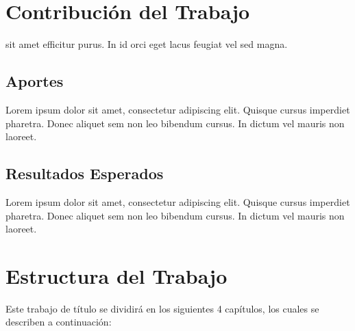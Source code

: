   \section{Contribución del Trabajo}

    sit amet efficitur purus. In id orci eget lacus feugiat vel sed magna.

    \subsection{Aportes}

      Lorem ipsum dolor sit amet, consectetur adipiscing elit. Quisque cursus imperdiet
      pharetra. Donec aliquet sem non leo bibendum cursus. In dictum vel mauris non
      laoreet.

    \subsection{Resultados Esperados}

      Lorem ipsum dolor sit amet, consectetur adipiscing elit. Quisque cursus imperdiet
      pharetra. Donec aliquet sem non leo bibendum cursus. In dictum vel mauris non
      laoreet.

  \section{Estructura del Trabajo}

    Este trabajo de título se dividirá en los siguientes 4 capítulos, los cuales se describen a continuación:

